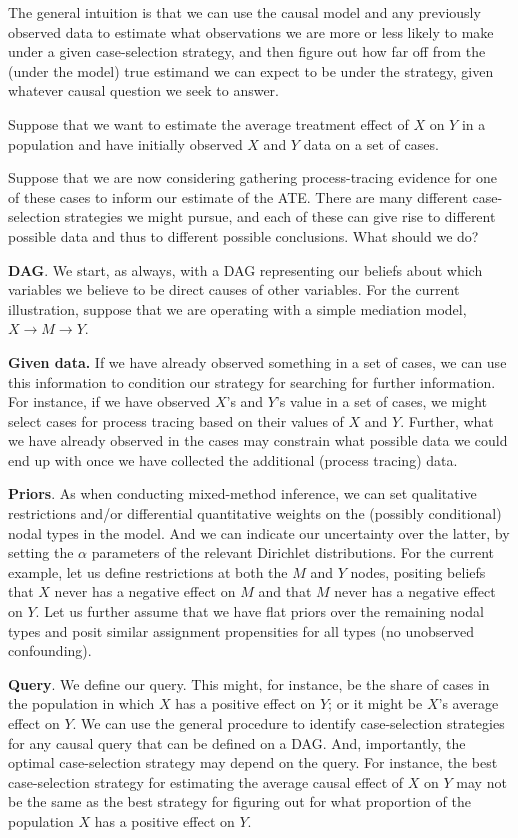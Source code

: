 \documentclass[
  12pt,
]{book}
\begin{document}
The general intuition is that we can use the causal model and any previously observed data to estimate what observations we are more or less likely to make under a given case-selection strategy, and then figure out how far off from the (under the model) true estimand we can expect to be under the strategy, given whatever causal question we seek to answer.

Suppose that we want to estimate the average treatment effect of \(X\) on \(Y\) in a population and have initially observed \(X\) and \(Y\) data on a set of cases.

Suppose that we are now considering gathering process-tracing evidence for one of these cases to inform our estimate of the ATE. There are many different case-selection strategies we might pursue, and each of these can give rise to different possible data and thus to different possible conclusions. What should we do?

\textbf{DAG}. We start, as always, with a DAG representing our beliefs about which variables we believe to be direct causes of other variables. For the current illustration, suppose that we are operating with a simple mediation model, \(X \rightarrow M \rightarrow Y\).

\textbf{Given data.} If we have already observed something in a set of cases, we can use this information to condition our strategy for searching for further information. For instance, if we have observed \(X\)'s and \(Y\)'s value in a set of cases, we might select cases for process tracing based on their values of \(X\) and \(Y\). Further, what we have already observed in the cases may constrain what possible data we could end up with once we have collected the additional (process tracing) data.

\textbf{Priors}. As when conducting mixed-method inference, we can set qualitative restrictions and/or differential quantitative weights on the (possibly conditional) nodal types in the model. And we can indicate our uncertainty over the latter, by setting the \(\alpha\) parameters of the relevant Dirichlet distributions. For the current example, let us define restrictions at both the \(M\) and \(Y\) nodes, positing beliefs that \(X\) never has a negative effect on \(M\) and that \(M\) never has a negative effect on \(Y\). Let us further assume that we have flat priors over the remaining nodal types and posit similar assignment propensities for all types (no unobserved confounding).

\textbf{Query}. We define our query. This might, for instance, be the share of cases in the population in which \(X\) has a positive effect on \(Y\); or it might be \(X\)'s average effect on \(Y\). We can use the general procedure to identify case-selection strategies for any causal query that can be defined on a DAG. And, importantly, the optimal case-selection strategy may depend on the query. For instance, the best case-selection strategy for estimating the average causal effect of \(X\) on \(Y\) may not be the same as the best strategy for figuring out for what proportion of the population \(X\) has a positive effect on \(Y\).
\end{document}
